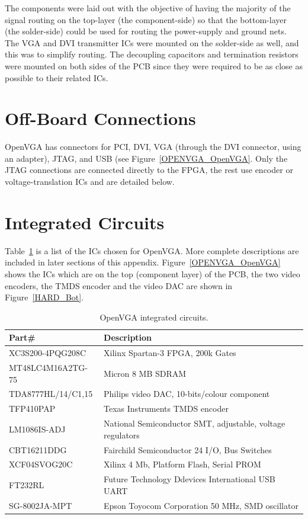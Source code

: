 The components were laid out with the objective of having the majority of the
signal routing on the top-layer (the component-side) so that the bottom-layer
(the solder-side) could be used for routing the power-supply and ground nets. The
VGA and DVI transmitter ICs were mounted on the solder-side as well, and this was
to simplify routing. The decoupling capacitors and termination resistors were
mounted on both sides of the PCB since they were required to be as close as
possible to their related ICs.


\section{Off-Board Connections}
OpenVGA has connectors for PCI, DVI, VGA (through the DVI connector, using an
adapter), JTAG, and USB (see Figure~\ref{OPENVGA_OpenVGA}. Only the JTAG
connections are connected directly to the FPGA, the rest use encoder or
voltage-translation ICs and are detailed below.


\section{Integrated Circuits}
Table~\ref{HARD_ICs} is a list of the ICs chosen for OpenVGA. More complete
descriptions are included in later sections of this appendix.
Figure~\ref{OPENVGA_OpenVGA} shows the ICs which are on the top (component layer)
of the PCB, the two video encoders, the TMDS encoder and the video DAC are shown
in Figure~\ref{HARD_Bot}.

\begin{table}[h!]
\begin{tabular}{l | l}
Part\#				& Description	\\
\hline
XC3S200-4PQG208C	&	Xilinx Spartan-3 FPGA, 200k Gates	\\
MT48LC4M16A2TG-75	&	Micron 8 MB SDRAM	\\
TDA8777HL/14/C1,15	&	Philips video DAC, 10-bits/colour component	\\
TFP410PAP			&	Texas Instruments TMDS encoder		\\
LM1086IS-ADJ		&	National Semiconductor SMT, adjustable, voltage regulators	\\
CBT16211DDG			&	Fairchild Semiconductor 24 I/O, Bus Switches	\\
XCF04SVOG20C		&	Xilinx 4 Mb, Platform Flash, Serial PROM	\\
FT232RL				&	Future Technology Ddevices International USB UART	\\
SG-8002JA-MPT		&	Epson Toyocom Corporation 50 MHz, SMD oscillator	\\
\end{tabular}
\caption[OpenVGA integrated circuits]{OpenVGA integrated circuits.}
\label{HARD_ICs}
\end{table}


